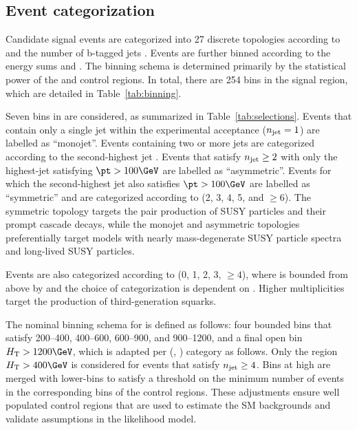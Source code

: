 \subsection{Event categorization}
\label{sec:categorization}

Candidate signal events are categorized into 27 discrete topologies
according to \njet and the number of b-tagged jets \nb. Events are
further binned according to the energy sums \scalht and \mht. The
binning schema is determined primarily by the statistical power of the
\mj and \mmj control regions. In total, there are 254 bins in the
signal region, which are detailed in Table~\ref{tab:binning}.

Seven bins in \njet are considered, as summarized in
Table~\ref{tab:selections}. Events that contain only a single jet
within the experimental acceptance ($n_{\text{jet}} = 1$) are labelled as
``monojet''. Events containing two or more jets are categorized
according to the second-highest jet \pt. Events that satisfy $n_{\text{jet}}
\geq 2$ with only the highest-\pt jet satisfying $\pt > 100\GeV$ are
labelled as ``asymmetric''. Events for which the second-highest jet
\pt also satisfies $\pt > 100\GeV$ are labelled as ``symmetric'' and
are categorized according to \njet (2, 3, 4, 5, and ${\geq}6$). The
symmetric topology targets the pair production of SUSY particles and
their prompt cascade decays, while the monojet and asymmetric
topologies preferentially target models with nearly mass-degenerate
SUSY particle spectra and long-lived SUSY particles.

Events are also categorized according to \nb (0, 1, 2, 3, ${\geq}4$),
where \nb is bounded from above by \njet and the choice of
categorization is dependent on \njet. Higher \nb multiplicities target
the production of third-generation squarks. 

The nominal binning schema for \scalht is defined as follows: four
bounded bins that satisfy 200--400, 400--600, 600--900, and
900--1200\GeV, and a final open bin $\scalht > 1200\GeV$, which is
adapted per (\njet, \nb) category as follows. Only the region $\scalht
> 400\GeV$ is considered for events that satisfy $n_{\text{jet}} \geq 4$. Bins
at high \scalht are merged with lower-\scalht bins to satisfy a
threshold on the minimum number of events in the corresponding bins of
the control regions. These adjustments ensure well populated control
regions that are used to estimate the SM backgrounds and validate
assumptions in the likelihood model. 

